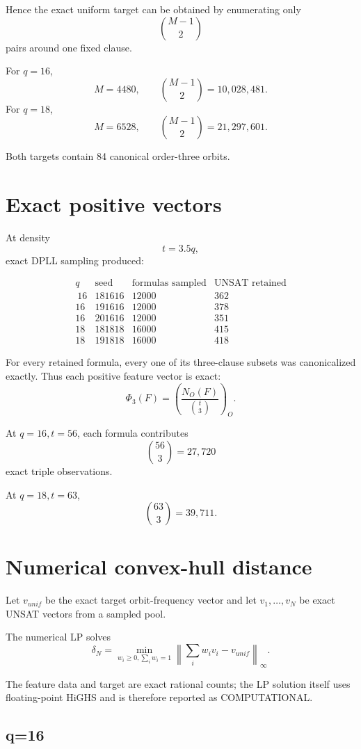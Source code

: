\documentclass[11pt]{article}
\begin{document}
Hence the exact uniform target can be obtained by enumerating only
\[
\binom{M-1}{2}
\]
pairs around one fixed clause.

For \(q=16\),
\[
M=4480,
\qquad
\binom{M-1}{2}=10{,}028{,}481.
\]
For \(q=18\),
\[
M=6528,
\qquad
\binom{M-1}{2}=21{,}297{,}601.
\]

Both targets contain 84 canonical order-three orbits.

\section{Exact positive vectors}

At density
\[
t=3.5q,
\]
exact DPLL sampling produced:

\[
\begin{array}{c|c|c|c}
q & \text{seed} & \text{formulas sampled} & \text{UNSAT retained} \\\
\hline
16 & 181616 & 12000 & 362 \\
16 & 191616 & 12000 & 378 \\
16 & 201616 & 12000 & 351 \\
18 & 181818 & 16000 & 415 \\
18 & 191818 & 16000 & 418
\end{array}
\]

For every retained formula, every one of its three-clause subsets was
canonicalized exactly.  Thus each positive feature vector is exact:
\[
\Phi_3(F)
=
\left(
\frac{N_O(F)}{\binom t3}
\right)_O.
\]

At \(q=16,t=56\), each formula contributes
\[
\binom{56}{3}=27{,}720
\]
exact triple observations.

At \(q=18,t=63\),
\[
\binom{63}{3}=39{,}711.
\]

\section{Numerical convex-hull distance}

Let \(v_{unif}\) be the exact target orbit-frequency vector and let
\(v_1,\ldots,v_N\) be exact UNSAT vectors from a sampled pool.

The numerical LP solves
\[
\delta_N
=
\min_{
w_i\ge0,\sum_i w_i=1
}
\left\|
\sum_i w_i v_i-v_{unif}
\right\|_\infty.
\tag{1}
\]

The feature data and target are exact rational counts; the LP solution itself
uses floating-point HiGHS and is therefore reported as COMPUTATIONAL.

\subsection*{q=16}
\end{document}
